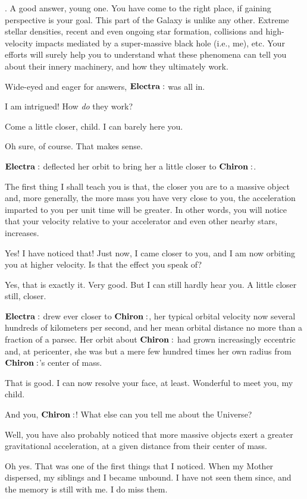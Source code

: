 \documentclass[main.tex]{subfiles}
\begin{document}
\Chiron.  A good answer, young one.  You have come to the right place, if gaining perspective is your goal.  This part of the Galaxy is unlike any other.  Extreme stellar densities, recent and even ongoing star formation, collisions and high-velocity impacts mediated by a super-massive black hole (i.e., me), etc.  Your efforts will surely help you to understand what these phenomena can tell you about their innery machinery, and how they ultimately work.

Wide-eyed and eager for answers, $\Electra$ was all in.

\Electra I am intrigued!  How \textit{do} they work?

\Chiron Come a little closer, child.  I can barely here you.

\Electra Oh sure, of course.  That makes sense.

$\Electra$ deflected her orbit to bring her a little closer to $\Chiron$.

\Chiron The first thing I shall teach you is that, the closer you are to a massive object and, more generally, the more mass you have very close to you, the acceleration imparted to you per unit time will be greater.  In other words, you will notice that your velocity relative to your accelerator and even other nearby stars, increases.

\Electra Yes!  I have noticed that!  Just now, I came closer to you, and I am now orbiting you at higher velocity.  Is that the effect you speak of?

\Chiron Yes, that is exactly it.  Very good.  But I can still hardly hear you.  A little closer still, closer.

$\Electra$ drew ever closer to $\Chiron$, her typical orbital velocity now several hundreds of kilometers per second, and her mean orbital distance no more than a fraction of a parsec.  Her orbit about $\Chiron$ had grown increasingly eccentric and, at pericenter, she was but a mere few hundred times her own radius from $\Chiron$'s center of mass.  

\Chiron That is good.  I can now resolve your face, at least.  Wonderful to meet you, my child.

\Electra  And you, $\Chiron$!  What else can you tell me about the Universe?

\Chiron Well, you have also probably noticed that more massive objects exert a greater gravitational acceleration, at a given distance from their center of mass.  

\Electra  Oh yes.  That was one of the first things that I noticed.  When my Mother dispersed, my siblings and I became unbound.  I have not seen them since, and the memory is still with me.  I do miss them.
\end{document}

